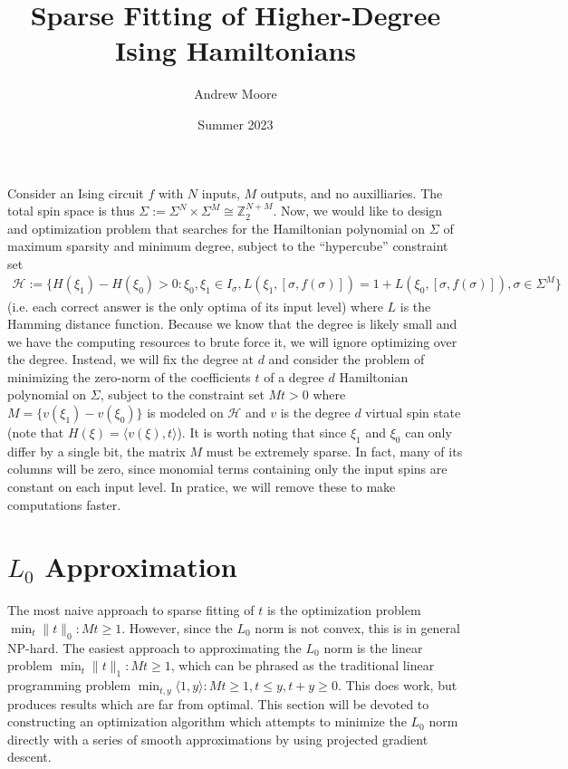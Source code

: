 \documentclass{article}
\title{Sparse Fitting of Higher-Degree Ising Hamiltonians}
\author{Andrew Moore}
\date{Summer 2023}
\newcommand{\Z}{{\mathbb{Z}}}
\begin{document}
\maketitle

Consider an Ising circuit $f$ with $N$ inputs, $M$ outputs, and no auxilliaries. The total spin space is thus $\Sigma := \Sigma^N \times \Sigma^M \cong \Z_2^{N+M}$. Now, we would like to design and optimization problem that searches for the Hamiltonian polynomial on $\Sigma$ of maximum sparsity and minimum degree, subject to the ``hypercube'' constraint set 
\begin{align}
		\mathcal{H} := \{H(\xi_1) - H(\xi_0) > 0 : \xi_0, \xi_1 \in I_\sigma, L(\xi_1, [\sigma, f(\sigma)]) = 1+L(\xi_0, [\sigma, f(\sigma)]), \sigma \in \Sigma^M\}
\end{align}
(i.e. each correct answer is the only optima of its input level) where $L$ is the Hamming distance function. Because we know that the degree is likely small and we have the computing resources to brute force it, we will ignore optimizing over the degree. Instead, we will fix the degree at $d$ and consider the problem of minimizing the zero-norm of the coefficients $t$ of a degree $d$ Hamiltonian polynomial on $\Sigma$, subject to the constraint set $Mt > 0$ where $M = \{v(\xi_1) - v(\xi_0)\}$ is modeled on $\mathcal{H}$ and $v$ is the degree $d$ virtual spin state (note that $H(\xi) = \langle v(\xi), t\rangle$). It is worth noting that since $\xi_1$ and $\xi_0$ can only differ by a single bit, the matrix $M$ must be extremely sparse. In fact, many of its columns will be zero, since monomial terms containing only the input spins are constant on each input level. In pratice, we will remove these to make computations faster.

\section{$L_0$ Approximation}

The most naive approach to sparse fitting of $t$ is the optimization problem $\min_t \|t\|_0 : Mt \geq 1$. However, since the $L_0$ norm is not convex, this is in general NP-hard. The easiest approach to approximating the $L_0$ norm is the linear problem $\min_t \|t\|_1 : Mt \geq 1$, which can be phrased as the traditional linear programming problem $\min_{t, y} \langle 1, y\rangle : Mt \geq 1, t \leq y, t+y \geq 0$. This does work, but produces results which are far from optimal. This section will be devoted to constructing an optimization algorithm which attempts to minimize the $L_0$ norm directly with a series of smooth approximations by using projected gradient descent.
\end{document}
